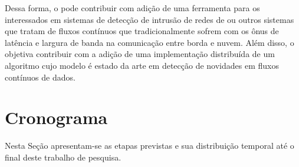 Dessa forma, o \mfog pode contribuir com adição de uma ferramenta para os interessados
em sistemas de detecção de intrusão de redes de 
ou outros sistemas que tratam de fluxos contínuos que tradicionalmente sofrem
com os ônus de latência e largura de banda na comunicação entre borda e nuvem.
Além disso, o \mfog objetiva contribuir com a adição de uma implementação
distribuída de um algoritmo cujo modelo é estado da arte em detecção de
novidades em fluxos contínuos de dados.


\section{Cronograma}\label{sec:crono}

Nesta Seção apresentam-se as etapas previstas e sua distribuição temporal até o
final deste trabalho de pesquisa.


